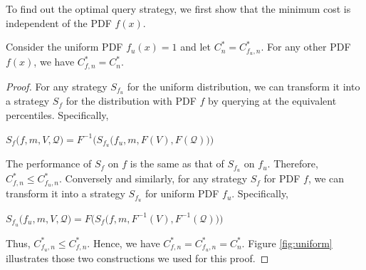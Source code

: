 To find out the optimal query strategy, we first show that the minimum cost
is independent of the PDF $f(x)$.

\begin{lemma}\label{lemma:uniform}
Consider the uniform PDF $f_u(x) = 1$ and let $C^*_n = C^*_{f_u, n}$.
For any other PDF $f(x)$, we have $C^*_{f, n} =  C^*_n$.
\end{lemma}


\begin{proof}
For any strategy $S_{f_u}$ for the uniform distribution, we can transform
it into a strategy $S_f$ for the distribution  with PDF $f$ 
by querying at the equivalent percentiles. Specifically, 

$
S_f\big(f, m, V, \mathcal Q \big) = F^{-1}\Big( S_{f_u}\big( f_u, m, F(V), F (\mathcal Q) \big) \Big)
$

The performance of $S_f$ on $f$ is the same as that of $S_{f_u}$ on $f_u$.
Therefore,  $C^*_{f, n} \leq C^*_{f_u, n}$.
Conversely and similarly, for any strategy $S_f$
for PDF $f$, we can transform it into a strategy $S_{f_u}$ for uniform PDF
$f_u$. Specifically,

$
S_{f_u}\big(f_u, m, V, \mathcal Q \big) = F\Big( S_f\big( f, m, F^{-1}(V), F^{-1} (\mathcal Q) \big) \Big)
$

Thus, $C^*_{f_u, n} \leq C^*_{f, n}$.  Hence,  we have $C^*_{f, n} = C^*_{f_u, n}
= C^*_n$. Figure \ref{fig:uniform} 
illustrates those two constructions we used for this proof.
\end{proof}

